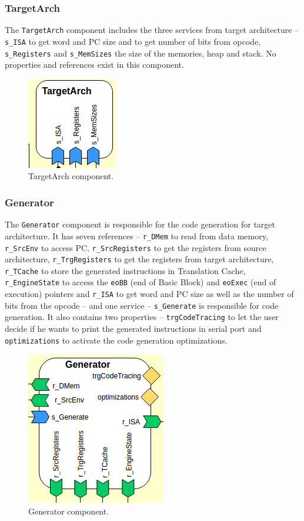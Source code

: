 \documentclass{report}
\begin{document}
			\subsubsection{TargetArch}
			
			\par The \texttt{TargetArch} component includes the three services from target architecture -- \texttt{s\_ISA} to get word and PC size and to get number of bits from opcode, \texttt{s\_Registers} and \texttt{s\_MemSizes} the size of the memories, heap and stack. No properties and references exist in this component.
			
			\begin{figure} [H]
				\centering
				\includegraphics[width=0.25\linewidth]{Images/arch-ref/TargetArch}
				\caption{TargetArch component.}
				\label{fig:TargetArch}
			\end{figure}
		
			\subsubsection{Generator}
			
			\par The \texttt{Generator} component is responsible for the code generation for target architecture. It has seven references -- \texttt{r\_DMem} to read from data memory, \texttt{r\_SrcEnv} to access PC, \texttt{r\_SrcRegisters} to get the registers from source architecture, \texttt{r\_TrgRegisters} to get the registers from target architecture, \texttt{r\_TCache} to store the generated instructions in Translation Cache, \texttt{r\_EngineState} to access the \texttt{eoBB} (end of Basic Block) and \texttt{eoExec} (end of execution) pointers and \texttt{r\_ISA} to get word and PC size as well as the number of bits from the opcode -- and one service -- \texttt{s\_Generate} is responsible for code generation. It also contains two properties -- \texttt{trgCodeTracing} to let the user decide if he wants to print the generated instructions in serial port and \texttt{optimizations} to activate the code generation optimizations.  
			
			\begin{figure} [H]
				\centering
				\includegraphics[width=0.35\linewidth]{Images/arch-ref/Generator}
				\caption{Generator component.}
				\label{fig:Generator}
			\end{figure}
			
\end{document}
